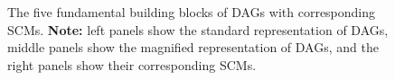 \documentclass[
  authoryear,
  preprint,
  1p]{elsarticle}
\begin{document}
\begin{figure}
\begin{minipage}{0.33\linewidth}
{}


\end{minipage}%
%
\begin{minipage}{0.33\linewidth}



\end{minipage}%
%
\begin{minipage}{0.33\linewidth}

\centering{

\[
\begin{aligned}
  X & := f_{X}(e_{X}) \\
  Z & := f_{Z}(X,Y,e_{Z}) \\
  Y & := f_{Y}(e_{Y}) \\
  e_{X} & \perp\!\!\!\perp e_{Y} \\
  e_{X} & \perp\!\!\!\perp e_{Z} \\
  e_{Z} & \perp\!\!\!\perp e_{Y}
\end{aligned}
\]

}


\end{minipage}%

\caption{\label{fig-dags_scms}The five fundamental building blocks of
DAGs with corresponding SCMs. \textbf{Note:} left panels show the
standard representation of DAGs, middle panels show the magnified
representation of DAGs, and the right panels show their corresponding
SCMs.}

\end{figure}%
\end{document}
